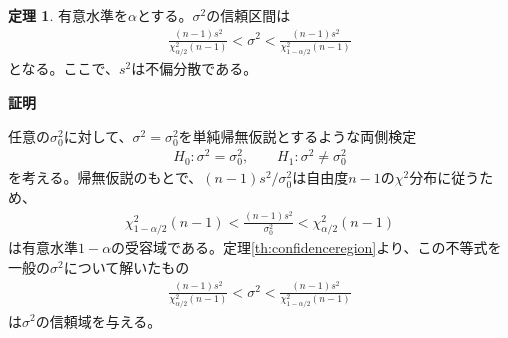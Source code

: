 \documentclass[11pt]{ltjsarticle}
\makeatletter
\theoremstyle{definition}
\newtheorem{theorem}{定理}[section]
\renewenvironment{proof}[1][証明]{\par
  \pushQED{\qed}%
  \normalfont \topsep6\p@\@plus6\p@\relax
  \trivlist
  \item\relax
  {\bfseries
  #1\@addpunct{.}}\hspace\labelsep\ignorespaces
}{%
  \popQED\endtrivlist\@endpefalse
}
\makeatother
\begin{document}
\begin{theorem}
    有意水準を$\alpha$とする。$\sigma^2$の信頼区間は
    \begin{align}
        \frac{(n-1)s^2}{\chi^2_{\alpha/2}(n-1)} < \sigma^2 < \frac{(n-1)s^2}{\chi^2_{1-\alpha/2}(n-1)}
    \end{align}
    となる。ここで、$s^2$は不偏分散である。
\end{theorem}
\begin{proof}
    任意の$\sigma_0^2$に対して、$\sigma^2=\sigma^2_0$を単純帰無仮説とするような両側検定
    \begin{align}\label{sigmatest}
            H_0: \sigma^2=\sigma^2_0,\qquad H_1: \sigma^2\neq \sigma^2_0
    \end{align}
    を考える。帰無仮説のもとで、$(n-1)s^2/\sigma_0^2$は自由度$n-1$の$\chi^2$分布に従うため、
    \begin{align}
        \chi_{1-\alpha/2}^2(n-1) < \frac{(n-1)s^2}{\sigma_0^2} < \chi_{\alpha/2}^2(n-1)
    \end{align}
    は有意水準$1-\alpha$の受容域である。定理\ref{th:confidenceregion}より、この不等式を一般の$\sigma^2$について解いたもの
    \begin{align}
        \frac{(n-1)s^2}{\chi^2_{\alpha/2}(n-1)} < \sigma^2 < \frac{(n-1)s^2}{\chi^2_{1-\alpha/2}(n-1)}
    \end{align}
    は$\sigma^2$の信頼域を与える。
\end{proof}
\end{document}
